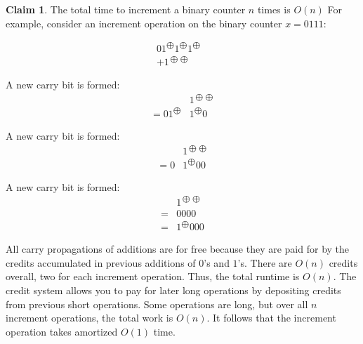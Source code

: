 \documentclass [12pt]{article}
\theoremstyle{definition}
\newtheorem{claim}{Claim}
\begin{document}
\begin{claim}{The total time to increment a binary counter $n$ times is $O(n)$}
For example, consider an increment operation on the binary counter $x = 0111$:

\begin{align*}
01^{\bigoplus}1^{\bigoplus}1^{\bigoplus}& \\
+1^{\bigoplus\bigoplus}&
\end{align*}

A new carry bit is formed:
\begin{align*}
&1^{\bigoplus\bigoplus}\\
=01^{\bigoplus}&1^{\bigoplus}0 
\end{align*}

A new carry bit is formed:
\begin{align*}
&1^{\bigoplus\bigoplus}\\
=0&1^{\bigoplus}00 
\end{align*}

A new carry bit is formed:
\begin{align*}
&1^{\bigoplus\bigoplus}\\
=&0000 \\
=&1^{\bigoplus}000
\end{align*}
\end{claim}

All carry propagations of additions are for free because they are paid for by the credits accumulated in previous additions of $0$'s and $1$'s. There are $O(n)$ credits overall, two for each increment operation. Thus, the total runtime is $O(n)$. The credit system allows you to pay for later long operations by depositing credits from previous short operations. Some operations are long, but over all $n$ increment operations, the total work is $O(n)$. It follows that the increment operation takes amortized $O(1)$ time.
\end{document}
